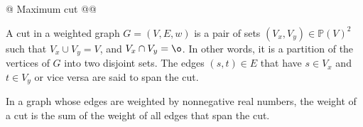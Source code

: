 \documentclass[]{article}
\newcommand{\textbs}[1]{{\sffamily\fontseries{sbc}\selectfont #1}}
\newcommand{\define}[1]{\textbs{#1}}
\begin{document}
\begin{easylist}[itemize]


@ Maximum cut
@@ {%
  A \define{cut} in a weighted graph $G = (V, E, w)$ is a pair of sets
  $(V_x, V_y) \in \mathbb{P}(V)^2$ such that $V_x \cup V_y = V$, and
  $V_x \cap V_y = \o$. In other words, it is a partition of the vertices of $G$
  into two disjoint sets. The edges $(s, t) \in E$ that have
  $s \in V_x$ and $t \in V_y$ or vice versa are said to \define{span} the cut.

  In a graph whose edges are weighted by nonnegative real numbers, the
  \define{weight} of a cut is the sum of the weight of all edges that span the
  cut.

}
\end{easylist}
\end{document}

